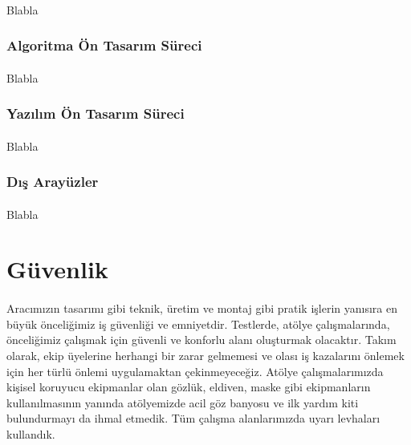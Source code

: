\documentclass[12pt]{article}
\begin{document}
\paragraph{} Blabla


\subsubsection{Algoritma Ön Tasarım Süreci}


\paragraph{} Blabla


\subsubsection{Yazılım Ön Tasarım Süreci}


\paragraph{} Blabla


\subsubsection{Dış Arayüzler}


\paragraph{} Blabla


\section{Güvenlik}


\paragraph{} Aracımızın tasarımı gibi teknik, üretim ve montaj gibi pratik işlerin yanısıra en büyük önceliğimiz iş güvenliği ve emniyetdir. Testlerde, atölye çalışmalarında, önceliğimiz çalışmak için güvenli ve konforlu alanı oluşturmak olacaktır. Takım olarak, ekip üyelerine herhangi bir zarar gelmemesi ve olası iş kazalarını önlemek için her türlü önlemi uygulamaktan çekinmeyeceğiz.
Atölye çalışmalarımızda kişisel koruyucu ekipmanlar olan gözlük, eldiven, maske gibi ekipmanların kullanılmasının yanında atölyemizde acil göz banyosu ve ilk yardım kiti bulundurmayı da ihmal etmedik. Tüm çalışma alanlarımızda uyarı levhaları kullandık.
\end{document}
